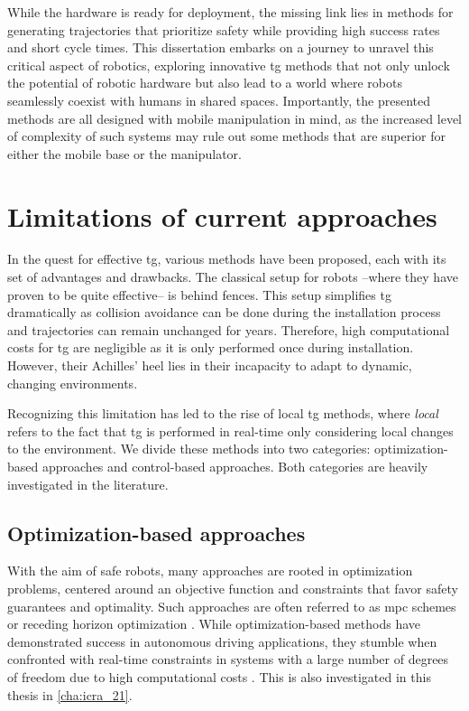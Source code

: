While the hardware is ready for deployment, the
missing link lies in methods for generating trajectories
that prioritize safety while providing high success rates
and short cycle times.
This dissertation embarks on a journey to unravel this
critical aspect of robotics, exploring innovative \ac{tg}
methods that not only unlock the potential of
robotic hardware but also lead to a world where robots
seamlessly coexist with humans in shared spaces.
Importantly, the presented methods are all designed with
mobile manipulation in mind, as the increased level of
complexity of such systems may rule out some methods that
are superior for either the mobile base or the manipulator.

\section{Limitations of current approaches}
\label{sec:limitations_of_current_approaches}

In the quest for effective \ac{tg}, various
methods have been proposed, each with its set of advantages and
drawbacks.
The classical setup for robots --where they have
proven to be quite effective-- is behind fences. This setup
simplifies \ac{tg} dramatically as collision
avoidance can be done during the installation process and
trajectories can remain unchanged for years.
Therefore, high computational costs for
\ac{tg} are negligible as it is only performed
once during installation. However, their Achilles' heel lies
in their incapacity to adapt to dynamic, changing
environments.

Recognizing this limitation has led to the rise of local
\ac{tg} methods, where \textit{local} refers to the fact
that \ac{tg} is performed in real-time only considering
local changes to the environment.
We divide these methods into two categories: optimization-based
approaches and control-based approaches. Both categories
are heavily investigated in the literature.
%
%
%
\subsection*{Optimization-based approaches}
With the aim of safe robots, many approaches are
rooted in optimization problems, centered around an
objective function and constraints that favor safety
guarantees and optimality. Such approaches are often
referred to as \ac{mpc} schemes or receding
horizon optimization \cite{hewing2020learning}. While
optimization-based methods have demonstrated success in
autonomous driving applications, they stumble when
confronted with real-time constraints in systems with
a large number of degrees of freedom due to high computational costs
\cite{spahn2021coupled}. This is also investigated in this
thesis in \cref{cha:icra_21}.

